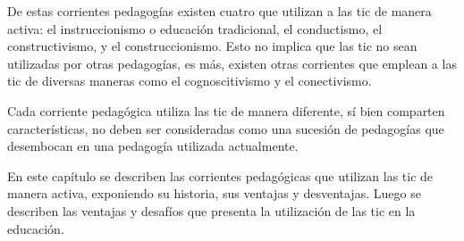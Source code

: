 De estas corrientes pedagogías existen cuatro que utilizan a las \Gls{tic} de
manera activa: el instruccionismo o educación tradicional, el conductismo, el
constructivismo, y el construccionismo. Esto no implica que las \Gls{tic} no
sean utilizadas por otras pedagogías, es más, existen otras corrientes que
emplean a las \Gls{tic} de diversas maneras como el
cognoscitivismo\cite{egenfeldt2007third,martin2008modelo} y el
conectivismo\cite{white:ict}. 

Cada corriente pedagógica utiliza las \Gls{tic} de manera diferente, sí bien
comparten características, no deben ser consideradas como una sucesión de
pedagogías que desembocan en una pedagogía utilizada actualmente.

En este capítulo se describen las corrientes pedagógicas que utilizan las
\gls{tic} de manera activa, exponiendo su historia, sus ventajas y desventajas.
Luego se describen las ventajas y desafíos que presenta la utilización de las
\Gls{tic} en la educación.

%
%






